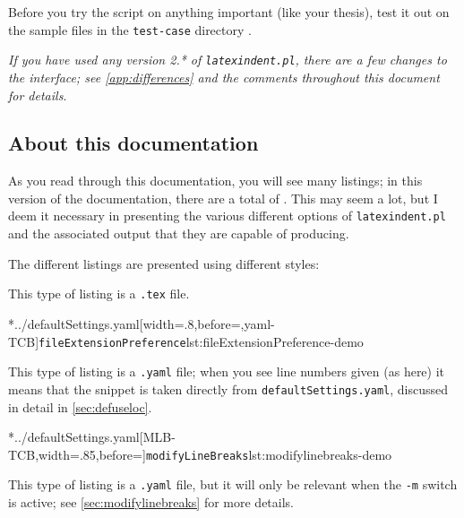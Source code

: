 	\begin{warning}
		Before you try the script on anything important (like your thesis), test it
		out on the sample files in the \texttt{test-case} directory \cite{latexindent-home}.
	\end{warning}

	\emph{If you have used any version 2.* of \texttt{latexindent.pl}, there
		are a few changes to the interface; see \vref{app:differences} and the comments
		throughout this document for details}.

\subsection{About this documentation}
	As you read through this documentation, you will see many listings; in this version of
	the documentation, there are a total of \totallstlistings. This may seem a lot, but I
	deem it necessary in presenting the various different options of \texttt{latexindent.pl}
	and the associated output that they are capable of producing.

	The different listings are presented using different styles:

	\begin{minipage}{.4\textwidth}
	\end{minipage}%
	\hfill
	\begin{minipage}{.4\textwidth}
		This type of listing is a \texttt{.tex} file.
	\end{minipage}%

	\begin{minipage}{.4\textwidth}
		\cmhlistingsfromfile[style=fileExtensionPreference]*{../defaultSettings.yaml}[width=.8\linewidth,before=\centering,yaml-TCB]{\texttt{fileExtensionPreference}}{lst:fileExtensionPreference-demo}
	\end{minipage}%
	\hfill
	\begin{minipage}{.4\textwidth}
		This type of listing is a \texttt{.yaml} file; when you see line numbers given (as here)
		it means that the snippet is taken directly from \texttt{defaultSettings.yaml}, discussed in
		detail in \vref{sec:defuseloc}.
	\end{minipage}%

	\begin{minipage}{.55\textwidth}
		\cmhlistingsfromfile[style=modifylinebreaks]*{../defaultSettings.yaml}[MLB-TCB,width=.85\linewidth,before=\centering]{\texttt{modifyLineBreaks}}{lst:modifylinebreaks-demo}
	\end{minipage}%
	\hfill
	\begin{minipage}{.4\textwidth}
		This type of listing is a \texttt{.yaml} file, but it will only
		be relevant when the \texttt{-m} switch is active; see \vref{sec:modifylinebreaks}
		for more details.
	\end{minipage}%

